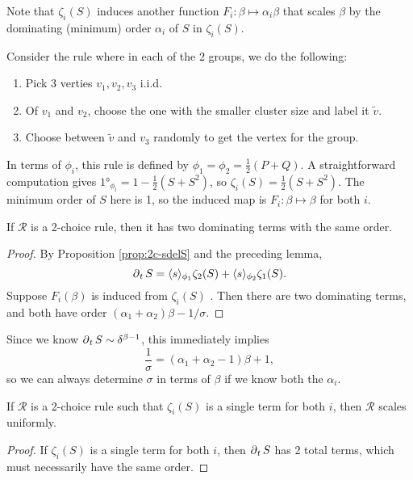 \documentclass[twoside,10pt]{article}
\begin{document}
Note that $\zeta_i(S)$ induces another function $F_i:\beta \mapsto \alpha_i \beta$ that scales $\beta$ by the dominating (minimum) order $\alpha_i$ of $S$ in $\zeta_i(S)$.

\begin{ex}[]
	Consider the rule where in each of the 2 groups, we do the following:
	\begin{enumerate}
		\item Pick 3 verties $v_1, v_2, v_3$ i.i.d.
		\item Of $v_1$ and $v_2$, choose the one with the smaller cluster size and label it $\tilde{v}$.
		\item Choose between $\tilde{v}$ and $v_3$ randomly to get the vertex for the group.
	\end{enumerate}
	In terms of $\phi_i$, this rule is defined by $\phi_1=\phi_2=\frac{1}{2} (P+Q)$. A straightforward computation gives $\ang{1}_{\phi_i} = 1 - \frac{1}{2} (S+S^2)$, so $\zeta_i(S) = \frac{1}{2} (S+S^2)$. The minimum order of $S$ here is 1, so the induced map is $F_i:\beta\mapsto \beta$ for both $i$.
\end{ex}

\begin{thrm}
If $\mathcal{R}$ is a 2-choice rule, then it has two dominating terms with the same order.
\end{thrm}
\begin{proof}
	By Proposition \ref{prop:2c-sdelS} and the preceding lemma,
        \[
	\operatorname{\partial}_{t}{S} = \langle s \rangle_{\phi_1}\zeta_{2}(S) + \langle s \rangle_{\phi_2} \zeta_{1}(S).
	\]
	Suppose $F_i(\beta)$ is induced from $\zeta_i(S)$ . Then there are two dominating terms, and both have order $(\alpha_1 + \alpha_2) \beta - 1/\sigma$.
\end{proof}

Since we know $\operatorname{\partial}_{t}{S} \sim \delta^{\beta-1}$, this immediately implies
\[
	\frac{1}{\sigma} = (\alpha_1+\alpha_2-1)\beta+1,
\] so we can always determine $\sigma$ in terms of $\beta$ if we know both the $\alpha_i$.

\begin{cor}
	If $\mathcal{R}$ is a 2-choice rule such that $\zeta_i(S)$ is a single term for both $i$, then $\mathcal{R}$ scales uniformly.
\end{cor}
\begin{proof}
	If $\zeta_i(S)$ is a single term for both $i$, then $\operatorname{\partial}_{t}{S} $ has 2 total terms, which must necessarily have the same order.
\end{proof}
\end{document}
